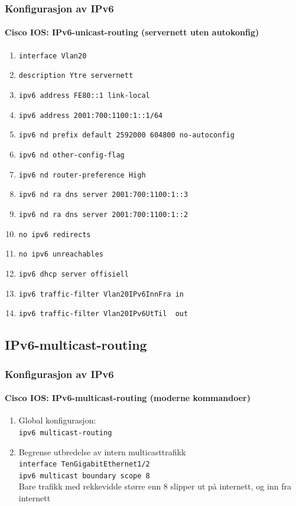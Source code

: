 \begin{frame}%
  \frametitle{Konfigurasjon av IPv6}
  \framesubtitle{Cisco IOS: IPv6-unicast-routing (servernett uten autokonfig)}
  \begin{enumerate}%
  \item \alert{\texttt{interface Vlan20}}
  \item \texttt{description Ytre servernett}
  \item {\texttt{ipv6 address FE80::1 link-local}}
  \item {\texttt{ipv6 address 2001:700:1100:1::1/64}}
  \item \alert{\texttt{ipv6 nd prefix default 2592000 604800 no-autoconfig}}
  \item {\texttt{ipv6 nd other-config-flag}}
  \item {\texttt{ipv6 nd router-preference High}}
  \item {\texttt{ipv6 nd ra dns server 2001:700:1100:1::3}}
  \item {\texttt{ipv6 nd ra dns server 2001:700:1100:1::2}}
  \item {\texttt{no ipv6 redirects}}
  \item {\texttt{no ipv6 unreachables}}
  \item {\texttt{ipv6 dhcp server offisiell}}
  \item {\texttt{ipv6 traffic-filter Vlan20IPv6InnFra in}}
  \item {\texttt{ipv6 traffic-filter Vlan20IPv6UtTil\ \ out}}
  \end{enumerate}
\end{frame}

\subsection{IPv6-multicast-routing}
\begin{frame}%
  \frametitle{Konfigurasjon av IPv6}
  \framesubtitle{Cisco IOS: IPv6-multicast-routing (moderne kommandoer)}
  \begin{enumerate}%
  \item Global konfigurasjon:\\
    \alert{\texttt{ipv6 multicast-routing}}\\
  \item Begrense utbredelse av intern multicasttrafikk\\
    \alert{\texttt{interface TenGigabitEthernet1/2}}\\
    \alert{\texttt{ipv6 multicast boundary scope 8}}\\
    Bare trafikk med rekkevidde større enn 8 slipper ut på internett,
    og inn fra internett
  \end{enumerate}
\end{frame}

